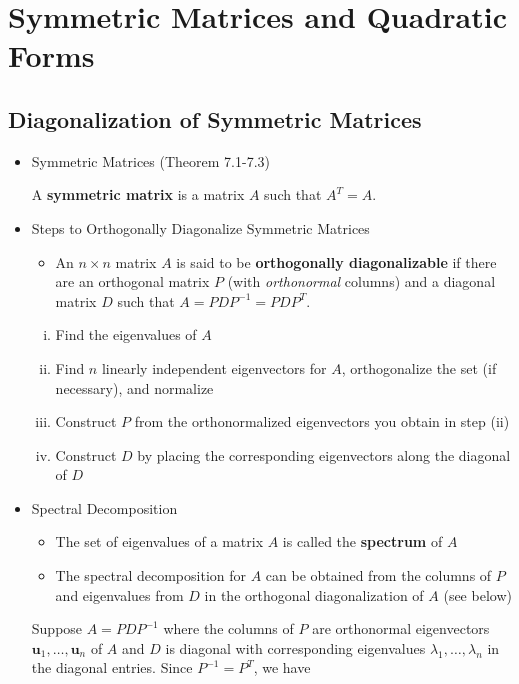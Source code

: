 \documentclass[10pt]{book}
\newenvironment{boxdef}{\begin{mdframed}[backgroundcolor=gray!30,linewidth=0pt,nobreak=true]}{\end{mdframed}}
\newcommand{\vect}[1]{\ensuremath{\boldsymbol{\mathbf{#1}}}}
\begin{document}
\newpage


\chapter[Symmetric Matrices \& Quad. Forms]{Symmetric Matrices and Quadratic Forms}
\section{Diagonalization of Symmetric Matrices}

\begin{itemize}
	\item Symmetric Matrices (Theorem 7.1-7.3)
		\begin{boxdef}
			A \textbf{symmetric matrix} is a matrix $A$ such that $A^T=A$.
		\end{boxdef}
	\item Steps to Orthogonally Diagonalize Symmetric Matrices
		\begin{itemize}
			\item An $n\times n$ matrix $A$ is said to be \textbf{orthogonally diagonalizable} if there are an orthogonal matrix $P$ (with \emph{orthonormal} columns) and a diagonal matrix $D$ such that $A=PDP^{-1}=PDP^T$.
		\end{itemize}
		\begin{enumerate}[(i)]\itemsep=0em
			\item Find the eigenvalues of $A$ 
			\item Find $n$ linearly independent eigenvectors for $A$, orthogonalize the set (if necessary), and normalize
			\item Construct $P$ from the orthonormalized eigenvectors you obtain in step (ii)
			\item Construct $D$ by placing the corresponding eigenvectors along the diagonal of $D$
		\end{enumerate}
	\item Spectral Decomposition
	\begin{itemize}
		\item The set of eigenvalues of a matrix $A$ is called the \textbf{spectrum} of $A$
		\item The spectral decomposition for $A$ can be obtained from the columns of $P$ and eigenvalues from $D$ in the orthogonal diagonalization of $A$ (see below)
	\end{itemize}
	\begin{boxdef}
	Suppose $A=PDP^{-1}$ where the columns of $P$ are orthonormal eigenvectors $\vect{u}_1,\ldots,\vect{u}_n$ of $A$ and $D$ is diagonal with corresponding eigenvalues $\lambda_1,\ldots,\lambda_n$ in the diagonal entries. Since $P^{-1}=P^T$, we have

\end{boxdef}
\end{itemize}
\end{document}
